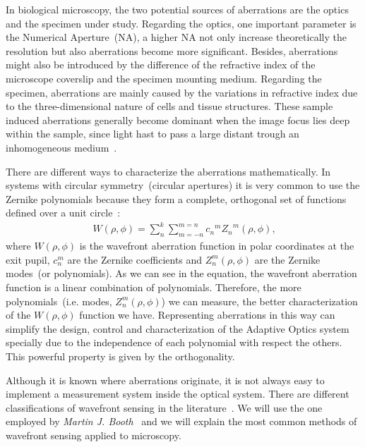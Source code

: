 In biological microscopy, the two potential sources of aberrations are the optics and the specimen under study. Regarding the optics, one important parameter is the Numerical Aperture~(NA), a higher NA not only increase theoretically the resolution but also aberrations become more significant. Besides, aberrations might also be introduced by the difference of the refractive index of the microscope coverslip and the specimen mounting medium. Regarding the specimen, aberrations are mainly caused by the variations in refractive index due to the three-dimensional nature of cells and tissue structures. These sample induced aberrations generally become dominant when the image focus lies deep within the sample, since light hast to pass a large distant trough an inhomogeneous medium~\cite{AOM_basic_ref}. 

There are different ways to characterize the aberrations mathematically. In systems with circular symmetry~(circular apertures) it is very common to use the Zernike polynomials because they form a complete, orthogonal set of functions defined over a unit circle~\cite{Zernike_original}:
\begin{align}
	\ W(\rho,\phi) = {\sum_{n}^{k}}{\sum_{m=-n}^{m=n}}{{c_n}^m {Z_n}^m}{(\rho,\phi)},
	\label{eq:aberration_zernike}
\end{align}
where $W(\rho,\phi)$ is the wavefront aberration function in polar coordinates at the exit pupil, $c_n^m$ are the Zernike coefficients and $Z_n^m (\rho,\phi)$ are the Zernike modes~(or polynomials). As we can see in the equation, the wavefront aberration function is a linear combination of polynomials. Therefore, the more polynomials~(i.e. modes, $Z_n^m (\rho,\phi)$) we can measure, the better characterization of the $W(\rho,\phi)$ function we have.
Representing aberrations in this way can simplify the design, control and characterization of the Adaptive Optics system specially due to the independence of each polynomial with respect the others. This powerful property is given by the orthogonality. 

Although it is known where aberrations originate, it is not always easy to implement a measurement system inside the optical system. There are different classifications of wavefront sensing in the literature~\cite{AO_engineering_handbook}. We will use the one employed by \emph{Martin J. Booth}~\cite{AOM_basic_ref} and we will explain the most common methods of wavefront sensing applied to microscopy.     
     
